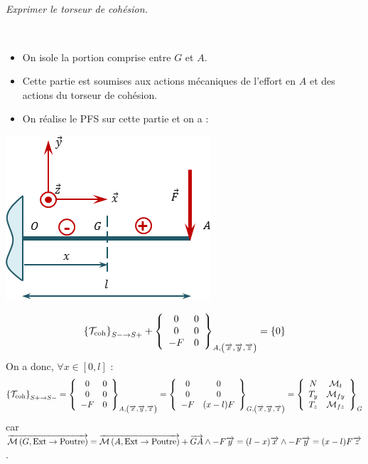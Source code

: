 \documentclass[10pt,fleqn]{article} %
\begin{document}
\begin{multicols}{2}
\subparagraph{}
\textit{Exprimer le torseur de cohésion.}
\ifprof
\begin{corrige} ~\\
\begin{minipage}[c]{.48\linewidth}
\begin{itemize}[label=,font=\color{ocre}] 
\item On isole la portion comprise entre $G$ et $A$.
\item Cette partie est soumises aux actions mécaniques de l'effort en $A$ et des actions du torseur de cohésion. 
\item On réalise le PFS sur cette partie et on a :
\end{itemize}
\end{minipage} \hfill
\begin{minipage}[c]{.48\linewidth}
\begin{center}
\includegraphics[width=.85\linewidth]{images/exo_01_01_corr_01}
\end{center}
\end{minipage} 

$$
\torseurscoh_{S-\rightarrow S+} + \torseurcol{0}{0}{-F}{0}{0}{0}{A,\left( \vect{x},\vect{y},\vect{z} \right)} = \{0\}
$$
On a donc, $\forall x \in\left[0,l\right]$ :
$$
\torseurscoh_{S+\rightarrow S-}
=\torseurcol{0}{0}{-F}{0}{0}{0}{A,\left( \vect{x},\vect{y},\vect{z} \right)}
=\torseurcol{0}{0}{-F}{0}{0}{(x-l) F}{G,\left( \vect{x},\vect{y},\vect{z} \right)}
=\torseurcol{N}{T_y}{T_z}{\mathcal{M}_t}{\mathcal{M}_{fy}}{\mathcal{M}_{fz}}{G}
$$
car $\vectm{G}{\text{Ext}}{\text{Poutre}}=\vectm{A}{\text{Ext}}{\text{Poutre}} + \vect{GA}\wedge - F \vect{y}  = (l-x)\vect{x} \wedge -F \vect{y} = (x-l) F \vect{z}$.


\end{corrige}
\end{multicols}
\end{document}
